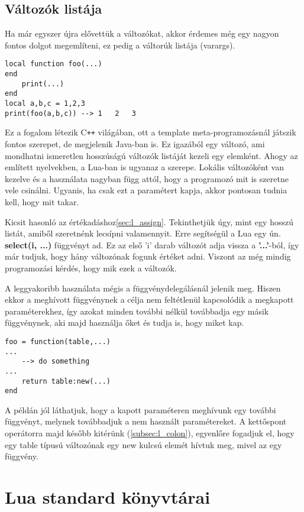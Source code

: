 \subsection{Változók listája}

Ha már egyszer újra elővettük a változókat, akkor érdemes még egy nagyon fontos dolgot megemlíteni, ez pedig a váltorúk listája (varargs).
\scriptsize 
\begin{lstlisting}
local function foo(...)
end
	print(...)
end
local a,b,c = 1,2,3
print(foo(a,b,c)) --> 1   2   3
\end{lstlisting}
\normalsize
Ez a fogalom létezik C\verb|++| világában, ott a template meta-programozásnál játszik fontos szerepet, de megjelenik Java-ban is. Ez igazából egy változó, ami mondhatni ismeretlen hosszúságú változók listáját kezeli egy elemként. Ahogy az említett nyelvekben, a Lua-ban is ugyanaz a szerepe. Lokális változóként van kezelve és a használata nagyban függ attól, hogy a programozó mit is szeretne vele csinálni. Ugyanis, ha csak ezt a paramétert kapja, akkor pontosan tudnia kell, hogy mit takar.

Kicsit hasonló az értékadáshoz\ref{sec:l_assign}. Tekinthetjük úgy, mint egy hosszú listát, amiből szeretnénk lecsípni valamennyit. Erre segítségül a Lua egy ún. \textbf{select(i, ...)} függvényt ad. Ez az első 'i' darab változót adja vissza a \textbf{'...'}-ból, így már tudjuk, hogy hány változónak fogunk értéket adni. Viszont az még mindig programozási kérdés, hogy mik ezek a változók.

A leggyakoribb használata mégis a függvénydelegálásnál jelenik meg. Hiszen ekkor a meghívott függvénynek a célja nem feltétlenül kapcsolódik a megkapott paraméterekhez, így azokat minden további nélkül továbbadja egy másik függvénynek, aki majd használja őket és tudja is, hogy miket kap.
\scriptsize
\begin{lstlisting}
foo = function(table,...)
... 
	--> do something
...
	return table:new(...)
end
\end{lstlisting}
\normalsize
A példán jól láthatjuk, hogy a kapott paraméteren meghívunk egy további függvényt, melynek továbbadjuk a nem használt paramétereket. A kettőspont operátorra majd később kitérünk (\ref{subsec:l_colon}), egyenlőre fogadjuk el, hogy egy table típusú változónak egy new kulcsú elemét hívtuk meg, mivel az egy függvény.

\section{Lua standard könyvtárai}
\label{sec:l_libs}

